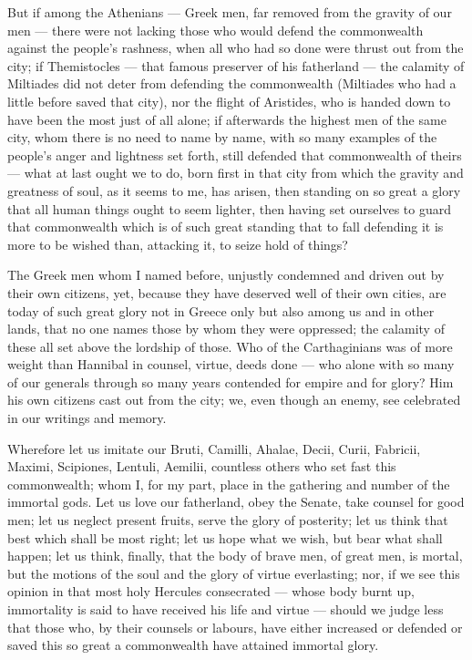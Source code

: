  But if among the Athenians --- Greek men, far removed from the gravity of our men --- there were not lacking those who would defend the commonwealth against the people's rashness, when all who had so done were thrust out from the city; if Themistocles --- that famous preserver of his fatherland --- the calamity of Miltiades did not deter from defending the commonwealth (Miltiades who had a little before saved that city), nor the flight of Aristides, who is handed down to have been the most just of all alone; if afterwards the highest men of the same city, whom there is no need to name by name, with so many examples of the people's anger and lightness set forth, still defended that commonwealth of theirs --- what at last ought we to do, born first in that city from which the gravity and greatness of soul, as it seems to me, has arisen, then standing on so great a glory that all human things ought to seem lighter, then having set ourselves to guard that commonwealth which is of such great standing that to fall defending it is more to be wished than, attacking it, to seize hold of things?

 The Greek men whom I named before, unjustly condemned and driven out by their own citizens, yet, because they have deserved well of their own cities, are today of such great glory not in Greece only but also among us and in other lands, that no one names those by whom they were oppressed; the calamity of these all set above the lordship of those. Who of the Carthaginians was of more weight than Hannibal in counsel, virtue, deeds done --- who alone with so many of our generals through so many years contended for empire and for glory? Him his own citizens cast out from the city; we, even though an enemy, see celebrated in our writings and memory.

 Wherefore let us imitate our Bruti, Camilli, Ahalae, Decii, Curii, Fabricii, Maximi, Scipiones, Lentuli, Aemilii, countless others who set fast this commonwealth; whom I, for my part, place in the gathering and number of the immortal gods. Let us love our fatherland, obey the Senate, take counsel for good men; let us neglect present fruits, serve the glory of posterity; let us think that best which shall be most right; let us hope what we wish, but bear what shall happen; let us think, finally, that the body of brave men, of great men, is mortal, but the motions of the soul and the glory of virtue everlasting; nor, if we see this opinion in that most holy Hercules consecrated --- whose body burnt up, immortality is said to have received his life and virtue --- should we judge less that those who, by their counsels or labours, have either increased or defended or saved this so great a commonwealth have attained immortal glory.

